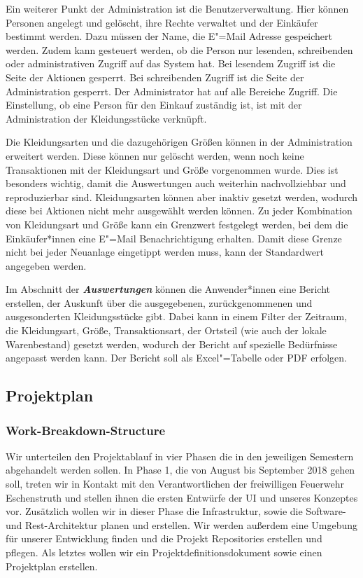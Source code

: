 Ein weiterer Punkt der Administration ist die Benutzerverwaltung. Hier können Personen angelegt und gelöscht, ihre Rechte verwaltet und der Einkäufer bestimmt werden. Dazu müssen der Name, die E"=Mail Adresse gespeichert werden. Zudem kann gesteuert werden, ob die Person nur lesenden, schreibenden oder administrativen Zugriff auf das System hat. Bei lesendem Zugriff ist die Seite der Aktionen gesperrt. Bei schreibenden Zugriff ist die Seite der Administration gesperrt. Der Administrator hat auf alle Bereiche Zugriff. Die Einstellung, ob eine Person für den Einkauf zuständig ist, ist mit der Administration der Kleidungsstücke verknüpft. 

Die Kleidungsarten und die dazugehörigen Größen können in der Administration erweitert werden. Diese können nur gelöscht werden, wenn noch keine Transaktionen mit der Kleidungsart und Größe vorgenommen wurde. Dies ist besonders wichtig, damit die Auswertungen auch weiterhin nachvollziehbar und reproduzierbar sind. Kleidungsarten können aber inaktiv gesetzt werden, wodurch diese bei Aktionen nicht mehr ausgewählt werden können. Zu jeder Kombination von Kleidungsart und Größe kann ein Grenzwert festgelegt werden, bei dem die Einkäufer*innen eine E"=Mail Benachrichtigung erhalten. Damit diese Grenze nicht bei jeder Neuanlage eingetippt werden muss, kann der Standardwert angegeben werden.

Im Abschnitt der \textit{\textbf{Auswertungen}} können die Anwender*innen eine Bericht erstellen, der Auskunft über die ausgegebenen, zurückgenommenen und ausgesonderten Kleidungsstücke gibt. Dabei kann in einem Filter der Zeitraum, die Kleidungsart, Größe, Transaktionsart, der Ortsteil (wie auch der lokale Warenbestand) gesetzt werden, wodurch der Bericht auf spezielle Bedürfnisse angepasst werden kann. Der Bericht soll als Excel"=Tabelle oder PDF erfolgen.

\subsection{Projektplan}
\subsubsection{Work-Breakdown-Structure}\label{sec:wbs}

Wir unterteilen den Projektablauf in vier Phasen die in den jeweiligen Semestern abgehandelt werden sollen. In Phase 1, die von August bis September 2018 gehen soll, treten wir in Kontakt mit den Verantwortlichen der freiwilligen Feuerwehr Eschenstruth und stellen ihnen die ersten Entwürfe der UI und unseres Konzeptes vor.
Zusätzlich wollen wir in dieser Phase die Infrastruktur, sowie die Software- und Rest-Architektur planen und erstellen. Wir werden außerdem eine Umgebung für unserer Entwicklung finden und die Projekt Repositories erstellen und pflegen.
Als letztes wollen wir ein Projektdefinitionsdokument sowie einen Projektplan erstellen.

